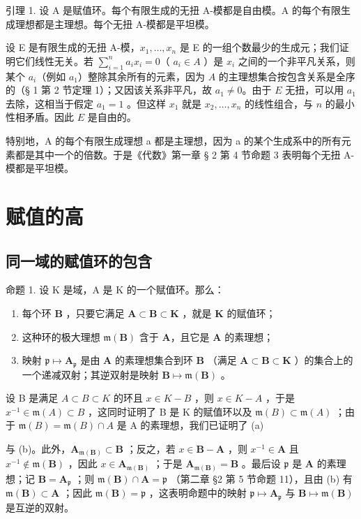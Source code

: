 引理 1. 设 A 是赋值环。每个有限生成的无扭 A-模都是自由模。A 的每个有限生成理想都是主理想。每个无扭 A-模都是平坦模。

设 E 是有限生成的无扭 A-模，\(x_{1}, \ldots, x_{n}\) 是 E 的一组个数最少的生成元；我们证明它们线性无关。若 \(\sum_{i=1}^{n} a_i x_i = 0\)（ \(a_i \in A\) ）是 \(x_i\) 之间的一个非平凡关系，则某个 \(a_i\)（例如 \(a_1\)）整除其余所有的元素，因为 \(A\) 的主理想集合按包含关系是全序的（§ 1 第 2 节定理 1）；又因该关系非平凡，故 \(a_1 \neq 0\)。由于 \(E\) 无扭，可以用 \(a_1\) 去除，这相当于假定 \(a_1 = 1\) 。但这样 \(x_1\) 就是 \(x_2, \ldots, x_n\) 的线性组合，与 \(n\) 的最小性相矛盾。因此 \(E\) 是自由的。

特别地，A 的每个有限生成理想 a 都是主理想，因为 a 的某个生成系中的所有元素都是其中一个的倍数。于是《代数》第一章 § 2 第 4 节命题 3 表明每个无扭 A-模都是平坦模。

\section{赋值的高}

\subsection{同一域的赋值环的包含}

命题 1. 设 K 是域，A 是 K 的一个赋值环。那么：

\begin{enumerate}
\def\labelenumi{(\alph{enumi})}
\item
  每个环 \(\mathbf{B}\) ，只要它满足 \(\mathbf{A} \subset \mathbf{B} \subset \mathbf{K}\) ，就是 \(\mathbf{K}\) 的赋值环；
\item
  这种环的极大理想 \(\mathfrak{m}(\mathbf{B})\) 含于 \(\mathbf{A}\)，且它是 \(\mathbf{A}\) 的素理想；
\item
映射 \(\mathfrak{p} \mapsto \mathbf{A}_{\mathfrak{p}}\) 是由 \(\mathbf{A}\) 的素理想集合到环 \(\mathbf{B}\) （满足 \(\mathbf{A} \subset \mathbf{B} \subset \mathbf{K}\) ）的集合上的一个递减双射；其逆双射是映射 \(\mathbf{B} \mapsto \mathfrak{m}(\mathbf{B})\) 。
\end{enumerate}

设 B 是满足 \(A \subset B \subset K\) 的环且 \(x \in K - B\) ，则 \(x \in K - A\) ，于是 \(x^{-1} \in \mathfrak{m}(A) \subset B\) ，这同时证明了 B 是 K 的赋值环以及 \(\mathfrak{m}(B) \subset \mathfrak{m}(A)\) ；由于 \(\mathfrak{m}(B) = \mathfrak{m}(B) \cap A\) 是 A 的素理想，我们已证明了 (a)

与 (b)。此外，\(\mathbf{A}_{\mathfrak{m}(\mathbf{B})} \subset \mathbf{B}\) ；反之，若 \(x \in \mathbf{B} - \mathbf{A}\) ，则 \(x^{-1} \in \mathbf{A}\) 且 \(x^{-1} \notin \mathfrak{m}(\mathbf{B})\) ，因此 \(x \in \mathbf{A}_{\mathfrak{m}(\mathbf{B})}\) ；于是 \(\mathbf{A}_{\mathfrak{m}(\mathbf{B})} = \mathbf{B}\) 。最后设 \(\mathfrak{p}\) 是 \(\mathbf{A}\) 的素理想；记 \(\mathbf{B} = \mathbf{A}_{\mathfrak{p}}\) ；则 \(\mathfrak{m}(\mathbf{B}) \cap \mathbf{A} = \mathfrak{p}\) （第二章 §2 第 5 节命题 11），且由 (b) 有 \(\mathfrak{m}(\mathbf{B}) \subset \mathbf{A}\) ；因此 \(\mathfrak{m}(\mathbf{B}) = \mathfrak{p}\) ，这表明命题中的映射 \(\mathfrak{p} \mapsto \mathbf{A}_{\mathfrak{p}}\) 与 \(\mathbf{B} \mapsto \mathfrak{m}(\mathbf{B})\) 是互逆的双射。

